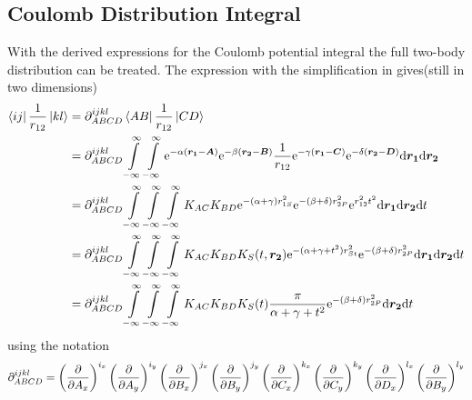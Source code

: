 \subsection{Coulomb Distribution Integral}
    With the derived expressions for the Coulomb potential integral the full
    two-body distribution can be treated. The expression with the
    simplification in  gives(still in two dimensions)
        \begin{align}
            \bra{ij}\frac{1}{r_{12}}\ket{kl} &= \prtl^{ijkl}_{ABCD}
            \bra{AB}\frac{1}{r_{12}}\ket{CD} \nonumber \\
            &= \prtl^{ijkl}_{ABCD} \infint\infint
            \me^{-\alpha(\blds{r_1}-\blds{A})}
            \me^{-\beta(\blds{r_2}-\blds{B})} \frac{1}{r_{12}}
            \me^{-\gamma(\blds{r_1}-\blds{C})}
            \me^{-\delta(\blds{r_2}-\blds{D})} \md\blds{r_1}\md\blds{r_2}
            \nonumber \\
            &= \prtl^{ijkl}_{ABCD} \infint\infint\infint K_{AC}K_{BD}
            \me^{-(\alpha+\gamma)r^2_{1S}}\me^{-(\beta+\delta)r^2_{2P}}
            \me^{r^2_{12}t^2} \md\blds{r_1}\md\blds{r_2} \md t \nonumber \\
            &= \prtl^{ijkl}_{ABCD} \infint\infint\infint
            K_{AC}K_{BD}K_S(t,\blds{r_2}) \me^{-(\alpha+\gamma+t^2)r^2_{St}}
            \me^{-(\beta+\delta)r^2_{2P}} \md\blds{r_1}\md\blds{r_2} \md t
            \nonumber \\
            &= \prtl^{ijkl}_{ABCD} \infint\infint\infint K_{AC}K_{BD}K_S(t)
            \frac{\pi}{\alpha+\gamma+t^2} \me^{-(\beta+\delta)r^2_{2P}}
            \md\blds{r_2} \md t
        \end{align}
    using the notation
    \begin{equation}
             \prtl^{ijkl}_{ABCD} = \prdp{A_x}{i_x}\prdp{A_y}{i_y}
             \prdp{B_x}{j_x}\prdp{B_y}{j_y} \prdp{C_x}{k_x}\prdp{C_y}{k_y}
             \prdp{D_x}{l_x}\prdp{B_y}{l_y}
    \end{equation}
